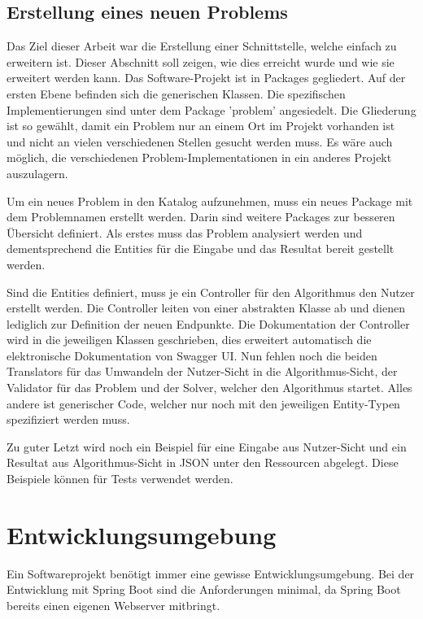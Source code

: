 \FloatBarrier

\subsection{Erstellung eines neuen Problems}
Das Ziel dieser Arbeit war die Erstellung einer Schnittstelle, welche einfach zu erweitern ist. Dieser Abschnitt soll zeigen, wie dies erreicht wurde und wie sie erweitert werden kann. Das 
Software-Projekt ist in Packages gegliedert. Auf der ersten Ebene befinden sich die generischen Klassen. Die spezifischen Implementierungen sind unter dem Package 'problem'  angesiedelt. 
Die Gliederung ist so gewählt, damit ein Problem nur an einem Ort im Projekt vorhanden ist und nicht an vielen verschiedenen Stellen gesucht werden muss. Es wäre auch möglich, 
die verschiedenen Problem-Implementationen in ein anderes Projekt auszulagern.

Um ein neues Problem in den Katalog aufzunehmen, muss ein neues Package mit dem Problemnamen erstellt werden. Darin sind weitere Packages zur besseren Übersicht definiert. Als 
erstes muss das Problem analysiert werden und dementsprechend die Entities für die Eingabe und das Resultat bereit gestellt werden.

Sind die Entities definiert, muss je ein Controller für den Algorithmus den Nutzer erstellt werden. Die Controller leiten von einer abstrakten Klasse ab und dienen lediglich zur Definition
der neuen Endpunkte. Die Dokumentation der Controller wird in die jeweiligen Klassen geschrieben, dies erweitert automatisch die elektronische Dokumentation von Swagger UI. 
Nun fehlen noch die beiden Translators für das Umwandeln der Nutzer-Sicht in die Algorithmus-Sicht, der Validator für das Problem und der Solver, welcher den Algorithmus 
startet. Alles andere ist generischer Code, welcher nur noch mit den jeweiligen Entity-Typen spezifiziert werden muss.

Zu guter Letzt wird noch ein Beispiel für eine Eingabe aus Nutzer-Sicht und ein Resultat aus Algorithmus-Sicht in JSON unter den Ressourcen abgelegt. Diese Beispiele können für Tests 
verwendet werden.

\newpage

\section{Entwicklungsumgebung}\label{entwicklungsumgebung}
Ein Softwareprojekt benötigt immer eine gewisse Entwicklungsumgebung. Bei der Entwicklung mit Spring Boot sind die Anforderungen minimal, da Spring Boot bereits einen eigenen Webserver 
mitbringt.


